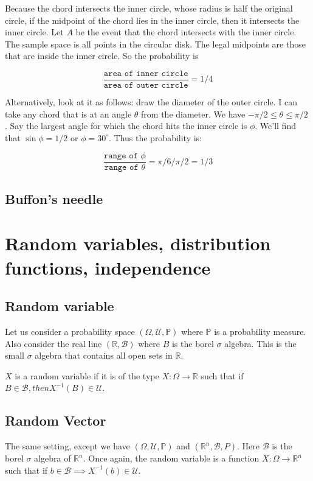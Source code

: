 \documentclass{book}
\newcommand{\R}{\ensuremath{\mathbb{R}}}
\renewcommand{\P}{\ensuremath{\mathbb{P}}}
\newcommand{\B}{\ensuremath{\mathscr{B}}}
\newcommand{\U}{\ensuremath{\mathscr{U}}}
\theoremstyle{definition}
\begin{document}
Because the chord intersects the inner circle, whose radius is half the
original circle, if the midpoint of the chord lies in the inner circle, then it
intersects the inner circle. Let $A$ be the event that the chord intersects with
the inner circle. The sample space is all points in the circular disk. The
legal midpoints are those that are inside the inner circle. So the probability is

$$
\frac{\texttt{area of inner circle}}{\texttt{area of outer circle}} = 1/4
$$

Alternatively, look at it as follows:
draw the diameter of the outer circle. I can take any chord that is at an
angle $\theta$ from the diameter. We have $-\pi/2 \leq \theta \leq \pi/2$ . 
Say the largest angle for which the chord hits the inner circle is $\phi$. We'll
find that $\sin \phi = 1/2$ or $\phi = 30^\circ$. Thus the probability is:



$$
\frac{\texttt{range of $\phi$}}{\texttt{range of $\theta$}} = \pi/6/\pi/2 = 1/3
$$



\section{Buffon's needle}


\chapter{Random variables, distribution functions, independence}



\section{Random variable}

Let us consider a probability space $(\Omega, \U, \P)$ where $\P$ is a probability
measure. Also consider the real line $(\R, \B)$  where $B$ is the borel $\sigma$
algebra. This is the small $\sigma$ algebra that contains all open sets in $\mathbb R$.

$X$ is a random variable if it is of the type $X: \Omega \rightarrow \R$
such that if $B \in \B, then X^{-1}(B) \in \U$.

\section{Random Vector}

The same setting, except we have $(\Omega, \U, \P)$ and $(\R^n, \B, P)$. Here
$\B$ is the borel $\sigma$ algebra of $\R^n$. Once again, the random variable
is a function $X: \Omega \rightarrow \R^n$ such that if $b \in \B \implies X^{-1}(b) \in \U$.
\end{document}
